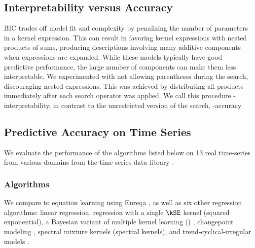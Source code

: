 \subsection{Interpretability versus Accuracy}

BIC trades off model fit and complexity by penalizing the number of parameters in a kernel expression.
This can result in \procedurename{} favoring kernel expressions with nested products of sums, producing descriptions involving many additive components when expressions are expanded.
While these models typically have good predictive performance, the large number of components can make them less interpretable.
We experimented with not allowing parentheses during the search, discouraging nested expressions.
This was achieved by distributing all products immediately after each search operator was applied.
We call this procedure \procedurename{}-interpretability, in contrast to the unrestricted version of the search, \procedurename{}-accuracy.


\subsection{Predictive Accuracy on Time Series}



We evaluate the performance of the algorithms listed below on 13 real time-series from various domains from the time series data library \citep{TSDL}.



\subsubsection{Algorithms}

We compare \procedurename{} to equation learning using Eureqa \citep{Eureqa}, as well as six other regression algorithms:
linear regression,
\gp{} regression with a single $\kSE$ kernel (squared exponential),
a Bayesian variant of multiple kernel learning (\MKL{}) \citep[e.g.][]{gonen2011multiple, bach2004multiple},
changepoint modeling \citep[e.g.][]{garnett2010sequential, saatcci2010gaussian, FoxDunson:NIPS2012},
spectral mixture kernels \citep{WilAda13} (spectral kernels),
and trend-cyclical-irregular models \citep[e.g.][]{lind2006basic}.

